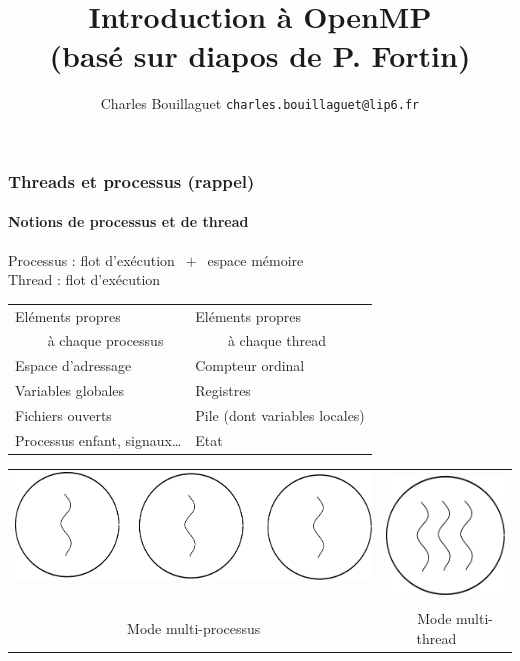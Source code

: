 \documentclass{beamer}
\author[C.~Bouillaguet]{Charles Bouillaguet \newline
  {\small \texttt{charles.bouillaguet@lip6.fr}}}
\title{Introduction à OpenMP \\ \vspace{1cm} (basé sur diapos de P. Fortin)}
\begin{document}
\begin{frame}
  \titlepage
\end{frame}
  

\begin{frame}
  \frametitle{Threads et processus (rappel)}
  \framesubtitle{Notions de processus et de thread}
  
  Processus : \og flot d'exécution \fg $~+~$ \og espace
  mémoire \fg \\
  Thread : \og flot d'exécution \fg 
  
  \bigskip

  \begin{tabularx}{\textwidth}{X|X}
    Eléments propres & Eléments propres \\
    $\qquad$ à chaque processus & $\qquad$ à chaque thread \\ 
    \hline
    Espace d'adressage & Compteur ordinal \\ 
    Variables globales & Registres \\
    Fichiers ouverts & Pile (dont variables locales)\\
    Processus enfant, signaux\dots & Etat \\
  \end{tabularx}
  
  \bigskip

  \begin{tabularx}{\textwidth}{c|c}
    \includegraphics[height=0.2\textheight]{multi-processus}$\quad$&
    \includegraphics[height=0.2\textheight]{multi-thread}\\
    
    Mode multi-processus    &
    $\quad$ Mode multi-thread $\quad$ \\
    
  \end{tabularx}
\end{frame}
\end{document}
